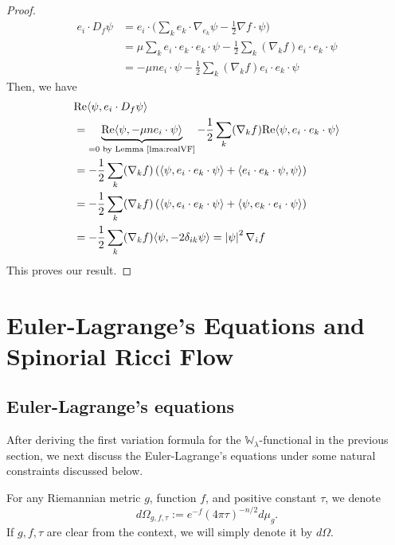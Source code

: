 \documentclass{amsart}
\theoremstyle{definition}
\theoremstyle{remark}
\numberwithin{equation}{section}
\newcommand{\abs}[1]{\left|#1\right|}
\begin{document}
\begin{proof}
\begin{align*}
e_i \cdot D_f\psi & = e_i \cdot \Big(\sum_k e_k \cdot \nabla_{e_k}\psi - \frac{1}{2}\nabla f \cdot \psi\Big)\\
& = \mu \sum_k e_i \cdot e_k \cdot e_k \cdot \psi - \frac{1}{2}\sum_k(\nabla_k f) e_i \cdot e_k \cdot \psi\\
& = -\mu n e_i \cdot \psi - \frac{1}{2}\sum_k (\nabla_k f)e_i \cdot e_k \cdot \psi
\end{align*}
Then, we have
\begin{align*}
& \textup{Re}\langle \psi, e_i \cdot D_f \psi\rangle\\
& = \underbrace{\textup{Re}\langle \psi, -\mu n e_i \cdot \psi\rangle}_{=0 \text{ by Lemma \ref{lma:realVF}}} -\frac{1}{2}\sum_k (\nabla_k f)\textup{Re}\langle \psi, e_i \cdot e_k \cdot \psi\rangle\\
& = - \frac{1}{2}\sum_k (\nabla_k f)\left(\langle \psi, e_i \cdot e_k \cdot \psi\rangle + \langle e_i \cdot e_k \cdot \psi, \psi\rangle\right)\\
& = - \frac{1}{2}\sum_k (\nabla_k f)\left(\langle \psi, e_i \cdot e_k \cdot \psi \rangle + \langle \psi, e_k \cdot e_i \cdot \psi\rangle\right)\\
& = -\frac{1}{2}\sum_k (\nabla_k f) \langle \psi, -2\delta_{ik}\psi\rangle = \abs{\psi}^2 \nabla_i f 
\end{align*}
This proves our result.
	
\end{proof}



\section{Euler-Lagrange's Equations and Spinorial Ricci Flow}
\label{sect:EL_GF}

\subsection{Euler-Lagrange's equations}
After deriving the first variation formula for the $\mathbb{W}_\lambda$-functional in the previous section, we next discuss the Euler-Lagrange's equations under some natural constraints discussed below.

For any Riemannian metric $g$, function $f$, and positive constant $\tau$, we denote
\[d\Omega_{g,f,\tau} := e^{-f}(4\pi\tau)^{-n/2}d\mu_g.\]
If $g,f,\tau$ are clear from the context, we will simply denote it by $d\Omega$.
\end{document}
